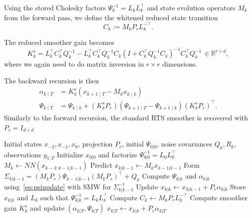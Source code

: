 \documentclass[a4paper,12pt]{article}
\begin{document}
Using the stored Cholesky factors $\Psi_{k}^{-1} = L_k L_{k}^{\top}$ and state evolution operators $M_k$ from the forward pass, we define the whitened reduced state transition
\begin{equation}
    C_{k} := M_k P_r L_{k}^{-\top}.
\end{equation}

The reduced smoother gain becomes
\begin{equation}
    K_{k}^{s} = L_{k}^{\top}C_{k}^{\top} Q_{k}^{-1} - L_{k}^{\top} C_{k}^{\top} Q_{k}^{-1} C_{k} (I + C_{k}^{\top} Q_{k}^{-1} C_{k})^{-1} C_{k}^{\top} Q_{k}^{-1} \, \in \mathbb{R}^{r \times d},
\end{equation}
where we again need to do matrix inversion in $r \times r$ dimensions.

The backward recursion is then
\begin{align}
    \alpha_{k \mid T} &= K_{k}^{s}(x_{k+1 \mid T} - M_k x_{k \mid k})\\
    \Psi_{k \mid T} &= \Psi_{k \mid k} + (K_{k}^{s} P_r) (\Psi_{k+1 \mid T} - \Psi_{k+1 \mid k}) (K_{k}^{s} P_r)^{\top}.
\end{align}
Similarly to the forward recursion, the standard RTS smoother is recovered with $P_r=I_{d \times d}$

\begin{algorithm}
    \caption{Reduced Kalman filter with neural network advection and optional RTS smoothing}
    \begin{algorithmic}[1]
        \Require Initial states $x_{-2},x_{-1},x_0$, projection $P_r$, initial $\Psi_{0|0}$, noise covariances $Q_k,R_k$, observations $y_{1:T}$
        \State Initialize $x_{0|0}$ and factorize $\Psi_{0|0}^{-1} = L_0 L_0^\top$
        \State $M_k \gets NN(x_{k-3:k-1|k-1})$
        \State Predict $x_{k|k-1} \gets M_k x_{k-1|k-1}$
        \State Form $\Sigma_{k|k-1} = (M_k P_r)\Psi_{k-1|k-1}(M_k P_r)^\top + Q_k$
        \State Compute $\Psi_{k|k}$ and $\alpha_{k|k}$ using~\eqref{eq:psiupdate} with SMW for $\Sigma_{k|k-1}^{-1}$
        \State Update $x_{k|k} \gets x_{k|k-1} + P_r \alpha_{k|k}$
        \State Store $x_{k|k}$ and $L_k$ such that $\Psi_{k|k}^{-1}=L_k L_k^\top$
        \EndFor
        \State Compute $C_k \gets M_{k} P_r L_k^{-\top}$
        \State Compute smoother gain $K_k^s$ and update $(\alpha_{k|T},\Psi_{k|T})$
        \State $x_{k|T} \gets x_{k|k} + P_r \alpha_{k|T}$
        \EndFor
        \EndIf
    \end{algorithmic}
\end{algorithm}
\end{document}
